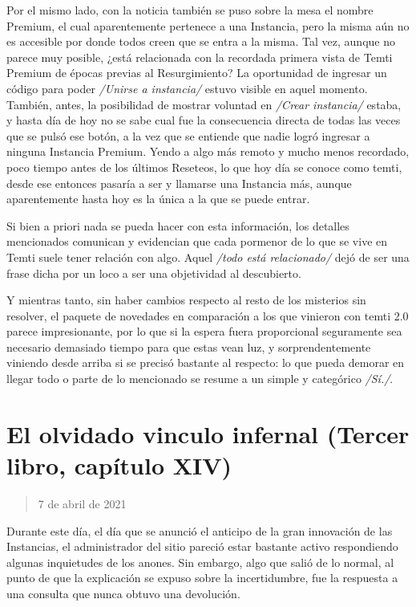 \documentclass[
  spanish,
]{book}
\begin{document}
Por el mismo lado, con la noticia también se puso sobre la mesa el nombre Premium, el cual aparentemente pertenece a una Instancia, pero la misma aún no es accesible por donde todos creen que se entra a la misma. Tal vez, aunque no parece muy posible, ¿está relacionada con la recordada primera vista de Temti Premium de épocas previas al Resurgimiento? La oportunidad de ingresar un código para poder \emph{/Unirse a instancia/} estuvo visible en aquel momento. También, antes, la posibilidad de mostrar voluntad en \emph{/Crear instancia/} estaba, y hasta día de hoy no se sabe cual fue la consecuencia directa de todas las veces que se pulsó ese botón, a la vez que se entiende que nadie logró ingresar a ninguna Instancia Premium. Yendo a algo más remoto y mucho menos recordado, poco tiempo antes de los últimos Reseteos, lo que hoy día se conoce como temti, desde ese entonces pasaría a ser y llamarse una Instancia más, aunque aparentemente hasta hoy es la única a la que se puede entrar.

Si bien a priori nada se pueda hacer con esta información, los detalles mencionados comunican y evidencian que cada pormenor de lo que se vive en Temti suele tener relación con algo. Aquel \emph{/todo está relacionado/} dejó de ser una frase dicha por un loco a ser una objetividad al descubierto.

Y mientras tanto, sin haber cambios respecto al resto de los misterios sin resolver, el paquete de novedades en comparación a los que vinieron con temti 2.0 parece impresionante, por lo que si la espera fuera proporcional seguramente sea necesario demasiado tiempo para que estas vean luz, y sorprendentemente viniendo desde arriba si se precisó bastante al respecto: lo que pueda demorar en llegar todo o parte de lo mencionado se resume a un simple y categórico \emph{/Sí./}.

\hypertarget{el-olvidado-vinculo-infernal-tercer-libro-capuxedtulo-xiv}{%
\section{El olvidado vinculo infernal (Tercer libro, capítulo XIV)}\label{el-olvidado-vinculo-infernal-tercer-libro-capuxedtulo-xiv}}

\begin{quote}
7 de abril de 2021
\end{quote}

Durante este día, el día que se anunció el anticipo de la gran innovación de las Instancias, el administrador del sitio pareció estar bastante activo respondiendo algunas inquietudes de los anones. Sin embargo, algo que salió de lo normal, al punto de que la explicación se expuso sobre la incertidumbre, fue la respuesta a una consulta que nunca obtuvo una devolución.
\end{document}
